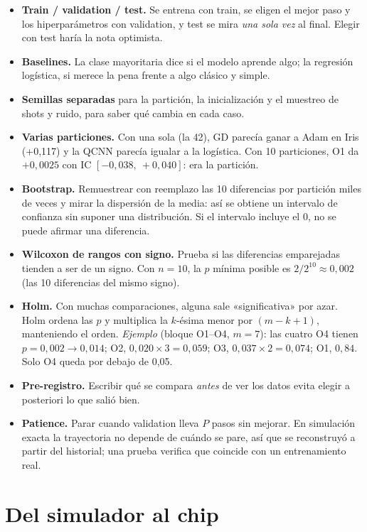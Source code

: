 \documentclass[11pt,a4paper]{article}
\begin{document}
\begin{itemize}
  \item \textbf{Train / validation / test.} Se entrena con train, se eligen el mejor paso y los hiperparámetros con
        validation, y test se mira \emph{una sola vez} al final. Elegir con test haría la nota optimista.
  \item \textbf{Baselines.} La clase mayoritaria dice si el modelo aprende algo; la regresión logística, si merece la
        pena frente a algo clásico y simple.
  \item \textbf{Semillas separadas} para la partición, la inicialización y el muestreo de shots y ruido, para saber qué
        cambia en cada caso.
  \item \textbf{Varias particiones.} Con una sola (la 42), GD parecía ganar a Adam en Iris (+0,117) y la QCNN parecía
        igualar a la logística. Con 10 particiones, O1 da $+0{,}0025$ con IC $[-0{,}038,\ +0{,}040]$: era la partición.
  \item \textbf{Bootstrap.} Remuestrear con reemplazo las 10 diferencias por partición miles de veces y mirar la
        dispersión de la media: así se obtiene un intervalo de confianza sin suponer una distribución. Si el intervalo
        incluye el 0, no se puede afirmar una diferencia.
  \item \textbf{Wilcoxon de rangos con signo.} Prueba si las diferencias emparejadas tienden a ser de un signo. Con
        $n=10$, la $p$ mínima posible es $2/2^{10}\approx0{,}002$ (las 10 diferencias del mismo signo).
  \item \textbf{Holm.} Con muchas comparaciones, alguna sale «significativa» por azar. Holm ordena las $p$ y multiplica
        la $k$-ésima menor por $(m-k+1)$, manteniendo el orden. \emph{Ejemplo} (bloque O1--O4, $m=7$): las cuatro O4
        tienen $p=0{,}002 \to 0{,}014$; O2, $0{,}020\times3 = 0{,}059$; O3, $0{,}037\times2 = 0{,}074$; O1, $0{,}84$.
        Solo O4 queda por debajo de 0,05.
  \item \textbf{Pre-registro.} Escribir qué se compara \emph{antes} de ver los datos evita elegir a posteriori lo que salió bien.
  \item \textbf{Patience.} Parar cuando validation lleva $P$ pasos sin mejorar. En simulación exacta la trayectoria no
        depende de cuándo se pare, así que se reconstruyó a partir del historial; una prueba verifica que coincide con
        un entrenamiento real.
\end{itemize}

\section{Del simulador al chip}
\end{document}
